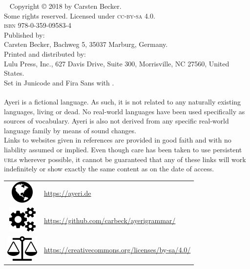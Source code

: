 ~\vfill
\begingroup
\setlength\parindent{0pt}\footnotesize
Copyright © 2018 by Carsten Becker.\\
Some rights reserved. Licensed under \textsc{cc-by-sa} 4.0.\\
\textsc{isbn} 978-0-359-09583-4\\

Published by:\\
Carsten Becker, Bachweg 5, 35037 Marburg, Germany.\\

Printed and distributed by:\\
Lulu Press, Inc., 627 Davis Drive, Suite 300, Morrisville, NC 27560, United
States.\\

Set in Junicode and {\sffamily Fira Sans} with \XeLaTeX{}.\\
\the\year\\

Ayeri is a fictional language. As such, it is not related to any naturally
existing languages, living or dead. No real-world languages have been used
specifically as sources of vocabulary. Ayeri is also not derived from any
specific real-world language family by means of sound changes.\\

Links to websites given in references are provided in good faith and with no
liability assumed or implied. Even though care has been taken to use persistent
\textsc{url}s wherever possible, it cannot be guaranteed that any of these
links will work indefinitely or show exactly the same content as on the date of
access.\\

\begin{tabular}{@{} c @{\enspace} l}
\includegraphics[scale=.8]{images/faicon-globe-300dpi.png}
& \href{https://ayeri.de}{https://ayeri.de}\\
\includegraphics[scale=.8]{images/faicon-cogs-300dpi.png}
& \href{https://github.com/carbeck/ayerigrammar}
	{https://github.com/carbeck/ayerigrammar/}\\
\includegraphics[scale=.8]{images/faicon-balance-scale-300dpi.png}
& \href{https://creativecommons.org/licenses/by-sa/4.0/}%
	{https://creativecommons.org/licenses/by-sa/4.0/}%
\end{tabular}
\endgroup
